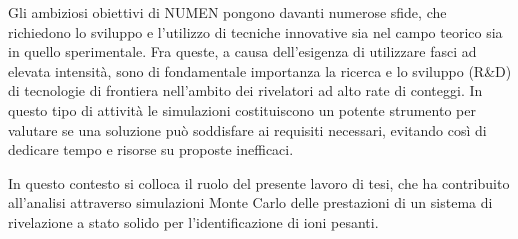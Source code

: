 Gli ambiziosi obiettivi di NUMEN pongono davanti numerose sfide, che richiedono lo sviluppo e l'utilizzo di tecniche innovative sia nel campo teorico sia in quello sperimentale. 
Fra queste, a causa dell'esigenza di utilizzare fasci ad elevata intensità, sono di fondamentale importanza la ricerca e lo sviluppo (R\&D) di tecnologie di frontiera nell'ambito dei rivelatori ad alto rate di conteggi.
In questo tipo di attività le simulazioni costituiscono un potente strumento per valutare se una soluzione può soddisfare ai requisiti necessari, evitando così di dedicare tempo e risorse su proposte inefficaci.

In questo contesto si colloca il ruolo del presente lavoro di tesi, che ha contribuito all'analisi attraverso simulazioni Monte Carlo delle prestazioni di un sistema di rivelazione a stato solido per l'identificazione di ioni pesanti.




